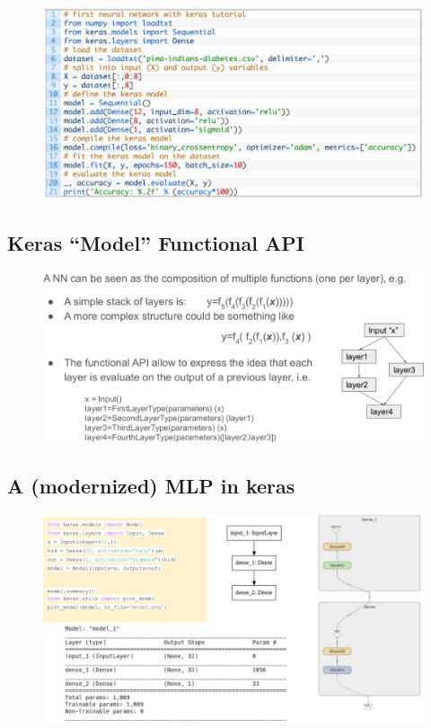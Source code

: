 \begin{figure}[ht]
	\centering
	\includegraphics[width=0.8\linewidth]{figure_ml/seq_ex.png}
\end{figure}
\FloatBarrier
\subsection{Keras “Model” Functional API}

\begin{figure}[ht]
	\centering
	\includegraphics[width=1\linewidth]{figure_ml/keras_model.png}
\end{figure}
\FloatBarrier

\subsection{A (modernized) MLP in keras}

\begin{figure}[ht]
	\centering
	\includegraphics[width=1\linewidth]{figure_ml/modernized_mlp.png}
\end{figure}
\FloatBarrier

